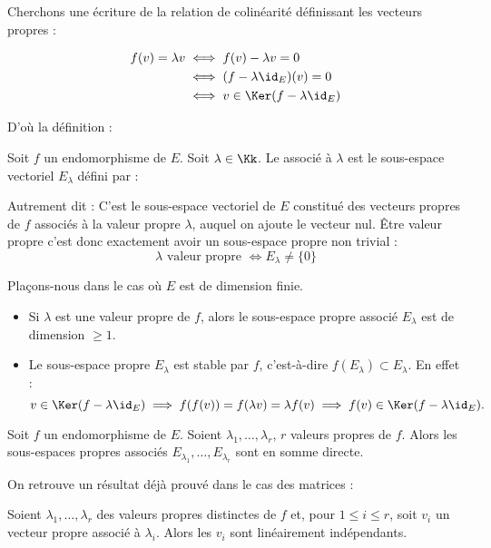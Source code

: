 \documentclass[12pt, class=report,crop=false]{standalone}
\begin{document}
Cherchons une écriture de la relation de colinéarité définissant les vecteurs propres :

\begin{align*}
f(v) = \lambda v 
 & \iff f(v) - \lambda v = 0 \\
 & \iff (f-\lambda\id_E)(v)=0 \\
 & \iff v\in\Ker(f-\lambda\id_E)
\end{align*}

D'où la définition :

\begin{definition}
Soit $f$ un endomorphisme de $E$. Soit $\lambda \in \Kk$.
Le  associé à $\lambda$ est le sous-espace vectoriel $E_\lambda$ défini par :
\end{definition} 
Autrement dit :
C'est le sous-espace vectoriel de $E$ constitué des vecteurs propres 
de $f$ associés à la valeur propre $\lambda$, auquel on ajoute le vecteur nul.
\^Etre valeur propre c'est donc exactement avoir un sous-espace propre non trivial :
$$\lambda \text{ valeur propre } \iff E_\lambda \neq \{ 0 \}$$


\begin{remarque*}
Plaçons-nous dans le cas où $E$ est de dimension finie.
\begin{itemize}
  \item Si $\lambda$ est une valeur propre de $f$, alors le sous-espace propre associé $E_\lambda$  est de dimension $\ge 1$. 
  
  
  \item Le sous-espace propre $E_\lambda$ est stable par $f$, c'est-à-dire $f(E_\lambda) \subset E_\lambda$. 
  En effet :
\[v  \in \Ker (f-\lambda \id_E) \implies f(f(v)) = f(\lambda v) = \lambda f(v)
\implies f(v) \in \Ker (f-\lambda \id_E) .\]
\end{itemize}
\end{remarque*}




\begin{theoreme}
\label{th:vpsommedirecte}
Soit $f$ un endomorphisme de $E$. Soient $\lambda_1,\ldots,\lambda_r$, $r$ valeurs propres  de $f$. Alors les sous-espaces propres associés $E_{\lambda_1},\ldots,E_{\lambda_r}$ sont en somme directe.
\end{theoreme}

On retrouve un résultat déjà prouvé dans le cas des matrices :
\begin{corollaire}
\label{cor:vpbislibre}
Soient $\lambda_1,\dots,\lambda_r$ des valeurs propres distinctes de 
$f$ et, pour $1\leq i\leq r$, soit $v_i$ un vecteur propre associé à 
$\lambda_i$. Alors les $v_i$ sont linéairement indépendants.
\end{corollaire}
\end{document}
